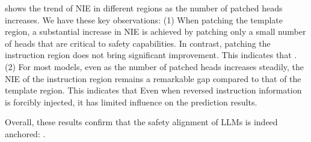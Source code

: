  shows the trend of NIE in different regions as the number of patched heads increases. We have these key observations: (1) When patching the template region, a substantial increase in NIE is achieved by patching only a small number of heads that are critical to safety capabilities. In contrast, patching the instruction region does not bring significant improvement. This indicates that . (2) For most models, even as the number of patched heads increases steadily, the NIE of the instruction region remains a remarkable gap compared to that of the template region. This indicates that  Even when reversed instruction information is forcibly injected, it has limited influence on the prediction results. 

Overall, these results confirm that the safety alignment of LLMs is indeed anchored: .

